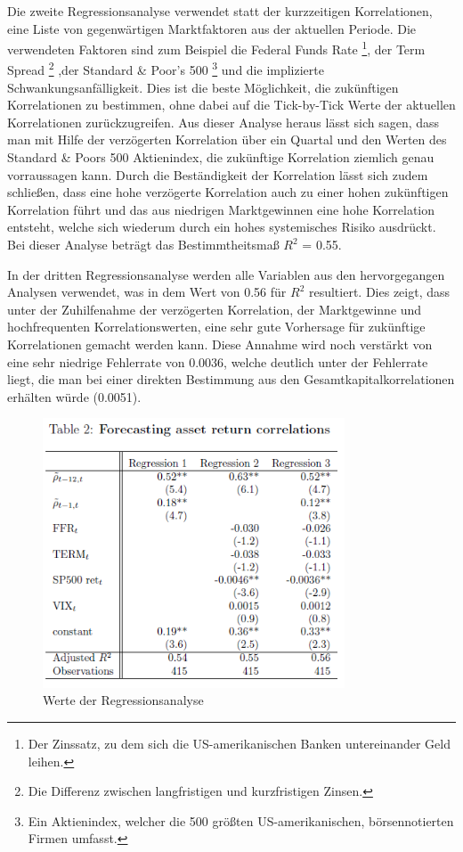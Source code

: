 \documentclass[a4paper,12pt]{scrartcl}
\begin{document}
Die zweite Regressionsanalyse verwendet statt der kurzzeitigen Korrelationen, eine Liste von gegenwärtigen Marktfaktoren aus der aktuellen Periode. Die verwendeten Faktoren sind zum Beispiel die Federal Funds Rate \footnote{Der Zinssatz, zu dem sich die US-amerikanischen Banken untereinander Geld leihen.}, der Term Spread \footnote{Die Differenz zwischen langfristigen und kurzfristigen Zinsen.} ,der Standard \& Poor's 500 \footnote{Ein Aktienindex, welcher die 500 größten US-amerikanischen, börsennotierten Firmen umfasst.} und die implizierte Schwankungsanfälligkeit.
Dies ist die beste Möglichkeit, die zukünftigen Korrelationen zu bestimmen, ohne dabei auf die Tick-by-Tick Werte der aktuellen Korrelationen zurückzugreifen.
Aus dieser Analyse heraus lässt sich sagen, dass man mit Hilfe der verzögerten Korrelation über ein Quartal und den Werten des Standard \& Poors 500 Aktienindex, die zukünftige Korrelation ziemlich genau vorraussagen kann. 
Durch die Beständigkeit der Korrelation lässt sich zudem schließen, dass eine hohe verzögerte Korrelation auch zu einer hohen zukünftigen Korrelation führt und das aus niedrigen Marktgewinnen eine hohe Korrelation entsteht, welche sich  wiederum durch ein hohes systemisches Risiko ausdrückt.
Bei dieser Analyse beträgt das Bestimmtheitsmaß $R^2$ = 0.55.

In der dritten Regressionsanalyse werden alle Variablen aus den hervorgegangen Analysen verwendet, was in dem Wert von 0.56 für $R^2$ resultiert. Dies zeigt, dass unter der Zuhilfenahme der verzögerten Korrelation, der Marktgewinne und hochfrequenten Korrelationswerten, eine sehr gute Vorhersage für zukünftige Korrelationen gemacht werden kann. 
Diese Annahme wird noch verstärkt von eine sehr niedrige Fehlerrate von 0.0036, welche deutlich unter der Fehlerrate liegt, die man bei einer direkten Bestimmung aus den Gesamtkapitalkorrelationen erhälten würde (0.0051). 

\begin{figure}[htb]
	\centering
		\includegraphics[height=8cm]{Pictures/Table2.png}
		\caption{Werte der Regressionsanalyse}
\end{figure}
\end{document}
